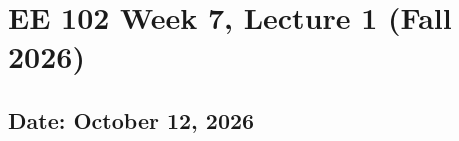 \documentclass{ee102_notes}
\renewcommand{\releasedate}{October 12, 2026}
\begin{document}
\section*{EE 102 Week 7, Lecture 1 (Fall 2026)}
\subsection*{Date: \releasedate}
\tableofcontents

\end{document}
